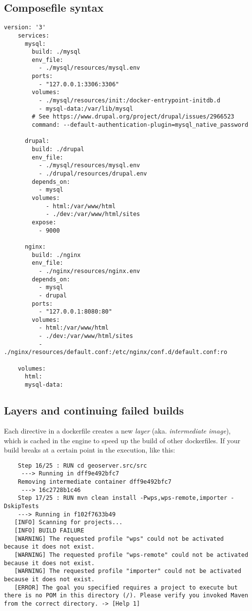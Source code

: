 \subsection{Composefile syntax}
\begin{lstlisting}[title=docker-compose.yml]
    version: '3'
    services: 
      mysql:
        build: ./mysql
        env_file:
          - ./mysql/resources/mysql.env
        ports:
          - "127.0.0.1:3306:3306"
        volumes:
          - ./mysql/resources/init:/docker-entrypoint-initdb.d
          - mysql-data:/var/lib/mysql
        # See https://www.drupal.org/project/drupal/issues/2966523
        command: --default-authentication-plugin=mysql_native_password
    
      drupal:
        build: ./drupal
        env_file:
          - ./mysql/resources/mysql.env
          - ./drupal/resources/drupal.env
        depends_on:
          - mysql
        volumes:
            - html:/var/www/html
            - ./dev:/var/www/html/sites
        expose:
          - 9000
    
      nginx:
        build: ./nginx
        env_file:
          - ./nginx/resources/nginx.env
        depends_on:
          - mysql
          - drupal
        ports:
          - "127.0.0.1:8080:80"
        volumes:
          - html:/var/www/html
          - ./dev:/var/www/html/sites
          - ./nginx/resources/default.conf:/etc/nginx/conf.d/default.conf:ro
    
    volumes:
      html:
      mysql-data:
\end{lstlisting}




\subsection{Layers and continuing failed builds}

Each directive in a dockerfile creates a new \emph{layer} (aka. \emph{intermediate image}), which is cached in the engine to speed up the build of other dockerfiles. 
If your build breaks at a certain point in the execution, like this: 

\begin{lstlisting}
    Step 16/25 : RUN cd geoserver.src/src
     ---> Running in dff9e492bfc7
    Removing intermediate container dff9e492bfc7
     ---> 16c2728b1c46
    Step 17/25 : RUN mvn clean install -Pwps,wps-remote,importer -DskipTests
    ---> Running in f102f7633b49
   [INFO] Scanning for projects...
   [INFO] BUILD FAILURE
   [WARNING] The requested profile "wps" could not be activated because it does not exist.
   [WARNING] The requested profile "wps-remote" could not be activated because it does not exist.
   [WARNING] The requested profile "importer" could not be activated because it does not exist.
   [ERROR] The goal you specified requires a project to execute but there is no POM in this directory (/). Please verify you invoked Maven from the correct directory. -> [Help 1]
\end{lstlisting}

